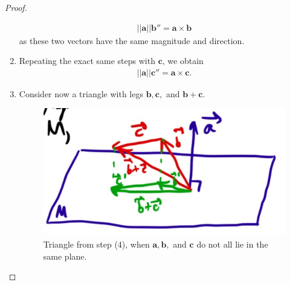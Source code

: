 \documentclass[12pt,letterpaper,reqno]{article}
\numberwithin{equation}{section}
\newcommand{\fixme}[1]{{\color{orange}{[#1]}}}
\begin{document}
\begin{proof}
\begin{enumerate}[(1)]
\begin{align}
			||\mathbf{a}||\mathbf{b}''=\mathbf{a} \times \mathbf{b}
		\end{align}
		as these two vectors have the same magnitude and direction.
		\item Repeating the exact same steps with $\mathbf{c}$, we obtain
		\begin{align}\label{eq:clever_c}
			||\mathbf{a}||\mathbf{c}''=\mathbf{a} \times \mathbf{c}.
		\end{align}
		\item Consider now a triangle with legs $\mathbf{b}, \mathbf{c},$ and $\mathbf{b}+\mathbf{c}$. 
	\begin{figure}[h]
		\begin{center}
			\includegraphics[scale=0.5]{figures_mvc/cp_proof_triangle_1}
		\end{center}
		\caption{Triangle from step (4), when $\mathbf{a}, \mathbf{b},$ and $\mathbf{c}$ do not all lie in the same plane. \fixme{Crop out writing in the corner of graphic.}}
	\end{figure}
	

\end{enumerate}
\end{proof}
\end{document}
